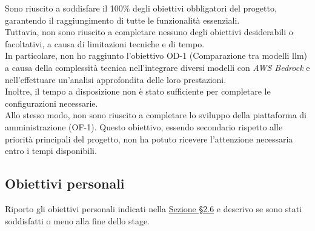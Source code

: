 \noindent Sono riuscito a soddisfare il 100\% degli obiettivi obbligatori del progetto, garantendo il raggiungimento di tutte le funzionalità essenziali. \\
Tuttavia, non sono riuscito a completare nessuno degli obiettivi desiderabili o facoltativi, a causa di limitazioni tecniche e di tempo.\\

\noindent In particolare, non ho raggiunto l'obiettivo OD-1 (Comparazione tra modelli \gls{llm}) a causa della complessità tecnica nell'integrare diversi modelli con \textit{AWS Bedrock} e nell'effettuare un'analisi approfondita delle loro prestazioni.\\
Inoltre, il tempo a disposizione non è stato sufficiente per completare le configurazioni necessarie.\\
Allo stesso modo, non sono riuscito a completare lo sviluppo della piattaforma di amministrazione (OF-1).
Questo obiettivo, essendo secondario rispetto alle priorità principali del progetto, non ha potuto ricevere l’attenzione necessaria entro i tempi disponibili.
\pagebreak
\subsection{Obiettivi personali}
\label{subsec:raggiungimento-obiettivi-personali}

Riporto gli obiettivi personali indicati nella \hyperref[sez:obiettivi-personali]{Sezione §2.6} e descrivo se sono stati soddisfatti o meno alla fine dello stage.\\

\renewcommand{\arraystretch}{1.5} %

